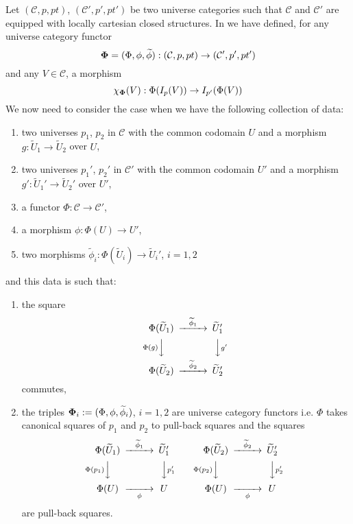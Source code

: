 \documentclass[12pt]{article}
\newcommand{\sr}{\rightarrow}
\newcommand{\wt}{\widetilde}
\newcommand{\spc}{{\,\,\,\,\,\,\,}}
\begin{document}
Let $({\mathcal C},p,pt)$, $({\mathcal C}',p',pt')$ be two universe categories such that $\mathcal C$ and $\mathcal C'$ are equipped with locally cartesian closed structures. In \cite[Construction 5.6]{fromunivwithPi} we have defined, for any universe category functor
%
$${\bf\Phi}=(\Phi,\phi,\wt{\phi}):({\mathcal C},p,pt)\sr ({\mathcal C}',p',pt')$$
%
and any $V\in {\mathcal C}$,  a morphism
%
$$\chi_{\bf\Phi}(V):\Phi(I_p(V))\sr I_{p'}(\Phi(V))$$
%
We now need to consider the case when we have the following collection of data:
%
\begin{enumerate}
\item two universes $p_1$, $p_2$ in $\mathcal C$ with the common codomain $U$ and a morphism $g:\wt{U}_1\sr \wt{U}_2$ over $U$,
\item two universes $p_1'$, $p_2'$ in $\mathcal C'$ with the common codomain $U'$ and a morphism $g':\wt{U}_1'\sr \wt{U}_2'$ over $U'$,
\item a functor $\Phi:{\mathcal C}\sr {\mathcal C}'$,
\item a morphism $\phi:\Phi(U)\sr U'$,
\item two morphisms $\wt{\phi}_i:\Phi(\wt{U}_i)\sr \wt{U}_i'$, $i=1,2$
\end{enumerate}
%
and this data is such that:
%
\begin{enumerate}
\item the square
%
$$
\begin{CD}
\Phi(\wt{U}_1) @>\wt{\phi}_1>> \wt{U}_1'\\
@V\Phi(g) VV @VV g'V\\
\Phi(\wt{U}_2) @>\wt{\phi}_2>> \wt{U}_2'
\end{CD}
$$ 
%
commutes,
%
\item the triples ${\bf\Phi}_i:=(\Phi,\phi,\wt{\phi}_i)$, $i=1,2$ are universe category functors i.e. 
$\Phi$ takes canonical squares of $p_1$ and $p_2$ to pull-back squares and the squares
%
$$
\begin{CD}
\Phi(\wt{U}_1) @>\wt{\phi}_1>> \wt{U}_1'\\
@V\Phi(p_1) VV @VVp_1' V\\
\Phi(U) @>>\phi> U
\end{CD}
%
\spc\spc\spc
%
\begin{CD}
\Phi(\wt{U}_2) @>\wt{\phi}_2>> \wt{U}_2'\\
@V\Phi(p_2) VV @VVp_2' V\\
\Phi(U) @>>\phi> U
\end{CD}
$$
%
are pull-back squares. 
\end{enumerate}
\end{document}
